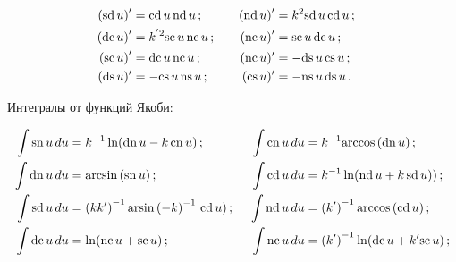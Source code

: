 {\begin{alignat*}{2}
\\

    \left(\sd\, u\right)' &= \cd\,u\,\nd \, u\,;&\quad

    \left(\nd\, u\right)' &=k^2 \sd\,u\,\cd \, u\,;

\\

        \left(\dc\, u\right)' &= k^{'2}\ssc\,u\,\nc \, u\,;&\quad

        \left(\nc\, u\right)' &= \ssc\,u\,\dc \, u\,;

\\

    \left(\ssc\, u\right)' &= \dc\,u\,\nc \, u\,;&\quad

    (\nc\, u)' &=- \ds\,u\,\cs \, u\,;

\\

        (\ds\, u)'& = -\cs\,u\,\ns \, u\,;&\quad

        (\cs\, u)' &=- \ns\,u\,\ds \, u\,.


        \end{alignat*}



Интегралы от функций Якоби:

   \begin{alignat*}{2}

    \int \sn\, u\, du &= k^{-1} \ln (\dn\, u - k\,\cn\, u)\,;&\enskip 

    \int \cn\, u\, du &= k^{-1} \mathrm{arccos}\,(\dn\, u )\,;

\\

    \int \dn\, u\, du &= \mathrm{arcsin}\, (\sn\, u )\,;&\enskip 

    \int \cd\, u\, du &= k^{-1} \ln(\nd\, u +k\,\sd\,u))\,;

\\

     \int \sd\, u\, du &= \left(kk'\right)^{-1} \mathrm{arsin} 

     \left( - k\right)^{-1}\,\cd\, u)\,;&\enskip 

     \int \nd\, u\, du &= \left(k'\right)^{-1} \mathrm{arccos}\,(\cd\, u )\,;

\\

     \int \dc\, u\, du& = \ln (\nc\, u +\ssc\, u)\,;&\enskip 

     \int \nc\, u\, du &= \left(k'\right)^{-1} \ln(\dc\, u +k'\ssc\,u)\,;


\end{alignat*}}
